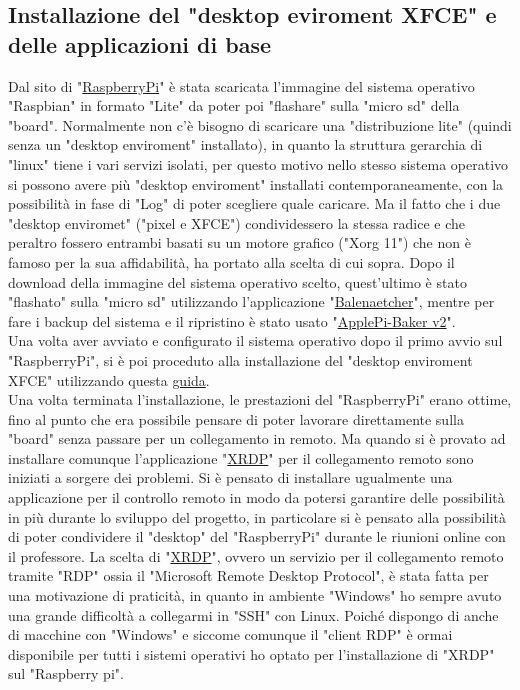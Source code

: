 \subsection{Installazione del "desktop eviroment XFCE" e delle applicazioni di base}
Dal sito di "\href{https://www.raspberrypi.com/software/operating-systems/}{RaspberryPi}" è stata scaricata l'immagine del sistema operativo "Raspbian" in formato "Lite" da poter poi "flashare" sulla "micro sd" della "board".  Normalmente non c'è bisogno di scaricare una "distribuzione lite" (quindi senza un "desktop enviroment" installato), in quanto la struttura gerarchia di "linux" tiene i vari servizi isolati, per questo motivo nello stesso sistema operativo si possono avere più "desktop enviroment" installati contemporaneamente, con la possibilità in fase di "Log" di poter scegliere quale caricare. Ma il fatto che i due "desktop enviromet" ("pixel e XFCE") condividessero la stessa radice e che peraltro fossero entrambi basati su un motore grafico ("Xorg 11") che non è famoso per la sua affidabilità, ha portato alla scelta di cui sopra. 
Dopo il download della immagine del sistema operativo scelto, quest'ultimo è stato "flashato" sulla "micro sd" utilizzando l'applicazione "\href{https://etcher.balena.io/}{Balenaetcher}", mentre per fare i backup del sistema e il ripristino è stato usato "\href{https://www.tweaking4all.com/software/macosx-software/applepi-baker-v2/}{ApplePi-Baker v2}". \\
Una volta aver avviato e configurato il sistema operativo dopo il primo avvio sul "RaspberryPi", si è poi proceduto alla installazione del "desktop enviroment XFCE" utilizzando questa \href{https://www.makeuseof.com/desktop-environments-you-can-run-on-a-raspberry-pi/}{guida}.\\
Una volta terminata l'installazione, le prestazioni del "RaspberryPi" erano ottime, fino al punto che era possibile pensare di poter lavorare direttamente sulla "board" senza passare per un collegamento in remoto. Ma quando si è provato ad installare comunque l'applicazione "\href{https://github.com/neutrinolabs/xrdp}{XRDP}" per il collegamento remoto sono iniziati a sorgere dei problemi. Si è pensato di installare ugualmente una applicazione per il controllo remoto in modo da potersi garantire delle possibilità in più durante lo sviluppo del progetto, in particolare si è pensato alla possibilità di poter condividere il "desktop" del "RaspberryPi" durante le riunioni online con il professore. La scelta di "\href{https://github.com/neutrinolabs/xrdp}{XRDP}", ovvero un servizio per il collegamento remoto tramite "RDP" ossia il "Microsoft Remote Desktop Protocol", è stata fatta per una motivazione di praticità, in quanto in ambiente "Windows" ho sempre avuto una grande difficoltà a collegarmi in "SSH" con Linux. Poiché dispongo di anche di macchine con "Windows" e siccome comunque il "client RDP" è ormai disponibile per tutti i sistemi operativi ho optato per l'installazione di "XRDP" sul "Raspberry pi".\\

